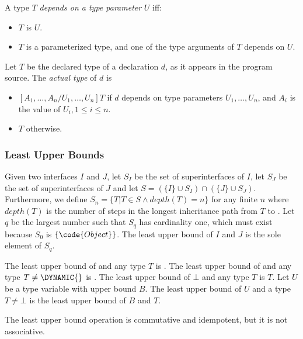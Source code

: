 \documentclass{article}
\begin{document}
\LMHash{}
A type $T$ {\em depends on a type parameter} $U$ if{}f:
\begin{itemize}
\item $T$ is $U$.
\item $T$ is a parameterized type, and one of the type arguments of $T$ depends on $U$.
\end{itemize}

\LMHash{}
Let $T$ be the declared type of a declaration $d$, as it appears in the program source.
The {\em actual type} of $d$ is

\begin{itemize}
\item $[A_1, \ldots, A_n/U_1, \ldots, U_n]T$ if $d$ depends on type parameters $U_1, \ldots, U_n$, and $A_i$ is the value of $U_i, 1 \le i \le n$.
\item $T$ otherwise.
\end{itemize}


\subsubsection{Least Upper Bounds}

\LMHash{}
Given two interfaces $I$ and $J$,
let $S_I$ be the set of superinterfaces of $I$,
let $S_J$ be the set of superinterfaces of $J$
and let $S = (\{I\} \cup S_I) \cap (\{J\} \cup S_J)$.
Furthermore,
we define $S_n = \{T | T \in S \wedge depth(T) = n\}$ for any finite $n$
where $depth(T)$ is the number of steps in the longest inheritance path
from $T$ to .
Let $q$ be the largest number such that $S_q$ has cardinality one,
which must exist because $S_0$ is $\{\code{Object}\}$.
The least upper bound of $I$ and $J$ is the sole element of $S_q$.

\LMHash{}
The least upper bound of \DYNAMIC{} and any type $T$ is \DYNAMIC{}.
The least upper bound of \VOID{} and any type $T \ne \DYNAMIC{}$ is \VOID{}.
The least upper bound of $\bot$ and any type $T$ is $T$.
Let $U$ be a type variable with upper bound $B$.
The least upper bound of $U$ and a type $T \ne \bot$ is the least upper bound of $B$ and $T$.

\LMHash{}
The least upper bound operation is commutative and idempotent,
but it is not associative.

\end{document}
